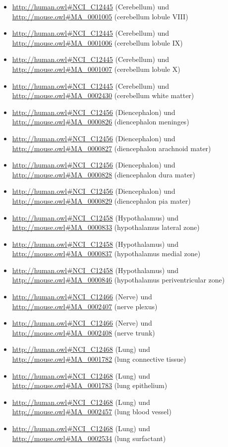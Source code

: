 \begin{itemize}
	\item \url{http://human.owl#NCI_C12445} (Cerebellum) und \url{http://mouse.owl#MA_0001005} (cerebellum lobule VIII)
	\item \url{http://human.owl#NCI_C12445} (Cerebellum) und \url{http://mouse.owl#MA_0001006} (cerebellum lobule IX)
	\item \url{http://human.owl#NCI_C12445} (Cerebellum) und \url{http://mouse.owl#MA_0001007} (cerebellum lobule X)
	\item \url{http://human.owl#NCI_C12445} (Cerebellum) und \url{http://mouse.owl#MA_0002430} (cerebellum white matter)
	\item \url{http://human.owl#NCI_C12456} (Diencephalon) und \url{http://mouse.owl#MA_0000826} (diencephalon meninges)
	\item \url{http://human.owl#NCI_C12456} (Diencephalon) und \url{http://mouse.owl#MA_0000827} (diencephalon arachnoid mater)
	\item \url{http://human.owl#NCI_C12456} (Diencephalon) und \url{http://mouse.owl#MA_0000828} (diencephalon dura mater)
	\item \url{http://human.owl#NCI_C12456} (Diencephalon) und \url{http://mouse.owl#MA_0000829} (diencephalon pia mater)
	\item \url{http://human.owl#NCI_C12458} (Hypothalamus) und \url{http://mouse.owl#MA_0000833} (hypothalamus lateral zone)
	\item \url{http://human.owl#NCI_C12458} (Hypothalamus) und \url{http://mouse.owl#MA_0000837} (hypothalamus medial zone)
	\item \url{http://human.owl#NCI_C12458} (Hypothalamus) und \url{http://mouse.owl#MA_0000846} (hypothalamus periventricular zone)
	\item \url{http://human.owl#NCI_C12466} (Nerve) und \url{http://mouse.owl#MA_0002407} (nerve plexus)
	\item \url{http://human.owl#NCI_C12466} (Nerve) und \url{http://mouse.owl#MA_0002408} (nerve trunk)
	\item \url{http://human.owl#NCI_C12468} (Lung) und \url{http://mouse.owl#MA_0001782} (lung connective tissue)
	\item \url{http://human.owl#NCI_C12468} (Lung) und \url{http://mouse.owl#MA_0001783} (lung epithelium)
	\item \url{http://human.owl#NCI_C12468} (Lung) und \url{http://mouse.owl#MA_0002457} (lung blood vessel)
	\item \url{http://human.owl#NCI_C12468} (Lung) und \url{http://mouse.owl#MA_0002534} (lung surfactant)

\end{itemize}
